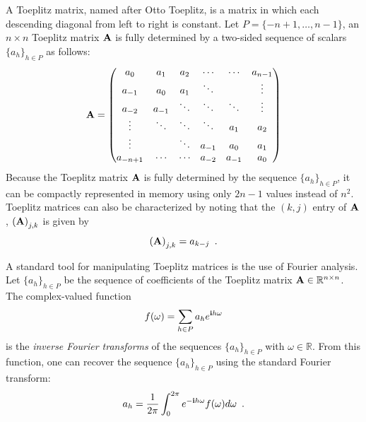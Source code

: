 A Toeplitz matrix, named after Otto Toeplitz, is a matrix in which each descending diagonal from left to right is constant.
Let $P = \{-n+1, \dots, n-1\}$, an $n\times n$ Toeplitz matrix $\mathbf{A}$ is fully determined by a two-sided sequence of scalars $\{a_h\}_{h \in P}$ as follows:
\begin{equation}
  \mathbf{A} =
  \begin{pmatrix}
    a_0 & a_{1} & a_{2} & \cdots & \cdots & a_{n-1} \\
    a_{-1} & a_0 & a_{1} & \ddots & & \vdots \\
    a_{-2} & a_{-1} & \ddots & \ddots & \ddots & \vdots \\
    \vdots & \ddots & \ddots & \ddots & a_{1} & a_{2} \\
    \vdots & & \ddots & a_{-1} & a_{0} & a_{1} \\
    a_{-n+1} & \cdots & \cdots & a_{-2} & a_{-1} & a_0
  \end{pmatrix}
\end{equation}
\noindent
Because the Toeplitz matrix $\mathbf{A}$ is fully determined by the sequence $\{a_h\}_{h \in P}$, it can be compactly represented in memory using only $2n-1$ values instead of $n^2$.
Toeplitz matrices can also be characterized by noting that the $(k,j)$ entry of $\mathbf{A}$, $\leftmat \Amat \rightmat_{j,k}$ is given by
\begin{equation}
  \leftmat \Amat \rightmat_{j,k} = a_{k-j} \enspace.
\end{equation}

A standard tool for manipulating Toeplitz matrices is the use of Fourier analysis.
Let $\{a_h\}_{h \in P}$ be the sequence of coefficients of the Toeplitz matrix $\mathbf{A} \in \mathbb{R}^{n\times n}$.
The complex-valued function 
\begin{equation}
  f(\omega) = \sum_{h \in P} a_h e^{\mathbf{i} h \omega}
\end{equation}
is the \emph{inverse Fourier transforms} of the sequences $\{a_h\}_{h \in P}$ with $\omega \in \mathbb{R}$.
From this function, one can recover the sequence $\{a_h\}_{h \in P}$ using the standard Fourier transform:
\begin{equation}
  a_h = \frac{1}{2\pi} \int_0^{2\pi} e^{-\mathbf{i} h \omega} f(\omega) d\omega \enspace. 
\end{equation}

